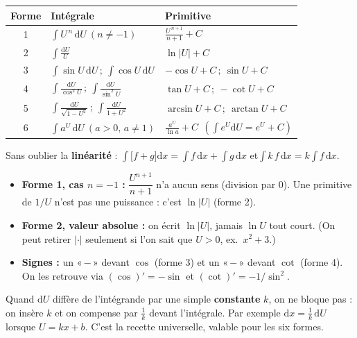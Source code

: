 \documentclass[11pt,a4paper]{article}
\newcommand{\dd}{\mathrm{d}}
\newcommand{\tg}{\tan}\newcommand{\cotg}{\cot}
\begin{document}
\renewcommand{\arraystretch}{1.7}
\noindent\begin{center}
\begin{tabular}{c l l}
\hline
\textbf{Forme} & \textbf{Intégrale} & \textbf{Primitive}\\
\hline
1 & $\displaystyle\int U^{\,n}\,\dd U\ (n\neq -1)$ & $\displaystyle\frac{U^{\,n+1}}{n+1}+C$ \\
2 & $\displaystyle\int \frac{\dd U}{U}$ & $\displaystyle\ln|U|+C$ \\
3 & $\displaystyle\int \sin U\,\dd U\,;\ \int \cos U\,\dd U$ & $\displaystyle-\cos U+C\,;\ \sin U+C$ \\
4 & $\displaystyle\int \frac{\dd U}{\cos^2 U}\,;\ \int \frac{\dd U}{\sin^2 U}$ & $\displaystyle\tg U+C\,;\ -\cotg U+C$ \\
5 & $\displaystyle\int \frac{\dd U}{\sqrt{1-U^2}}\,;\ \int \frac{\dd U}{1+U^2}$ & $\displaystyle\arcsin U+C\,;\ \arctan U+C$ \\
6 & $\displaystyle\int a^{U}\,\dd U\ (a>0,\,a\neq1)$ & $\displaystyle\frac{a^{U}}{\ln a}+C\ \ (\int e^{U}\dd U=e^{U}+C)$ \\
\hline
\end{tabular}
\end{center}
\renewcommand{\arraystretch}{1}

\noindent Sans oublier la \textbf{linéarité} : $\displaystyle\int\bigl[f+g\bigr]\dd x=\int f\,\dd x+\int g\,\dd x$
\quad et\quad $\displaystyle\int k\,f\,\dd x=k\int f\,\dd x$.

\begin{attention}
\begin{itemize}[leftmargin=1.5em,topsep=1pt,itemsep=1pt]
  \item \textbf{Forme 1, cas $n=-1$ :} $\dfrac{U^{n+1}}{n+1}$ n'a aucun sens (division par $0$).
        Une primitive de $1/U$ n'est pas une puissance : c'est $\ln|U|$ (forme 2).
  \item \textbf{Forme 2, valeur absolue :} on écrit $\ln|U|$, jamais $\ln U$ tout court.
        (On peut retirer $|\cdot|$ seulement si l'on sait que $U>0$, ex.\ $x^2+3$.)
  \item \textbf{Signes :} un «\,$-$\,» devant $\cos$ (forme 3) et un «\,$-$\,» devant $\cotg$
        (forme 4). On les retrouve via $(\cos)'=-\sin$ et $(\cotg)'=-1/\sin^2$.
\end{itemize}
\end{attention}

\begin{idee}
Quand $\dd U$ diffère de l'intégrande par une simple \textbf{constante} $k$, on ne bloque pas : on
insère $k$ et on compense par $\tfrac1k$ devant l'intégrale. Par exemple $\dd x=\tfrac1k\,\dd U$
lorsque $U=kx+b$. C'est la recette universelle, valable pour les six formes.
\end{idee}
\end{document}
